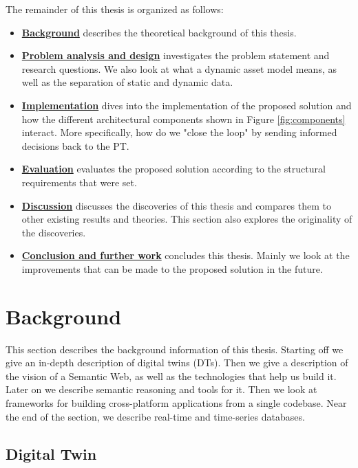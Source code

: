 \documentclass{article}
\begin{document}
The remainder of this thesis is organized as follows:
\begin{itemize}
    \item \hyperref[sec:Background]{\textbf{Background}} describes the theoretical background of this thesis.
    \item \hyperref[sec:Analysis]{\textbf{Problem analysis and design}} investigates the problem statement and research questions. We also look at what a dynamic asset model means, as well as the separation of static and dynamic data.
    \item \hyperref[sec:Implementation]{\textbf{Implementation}} dives into the implementation of the proposed solution and how the different architectural components shown in Figure \ref{fig:components} interact. More specifically, how do we "close the loop" by sending informed decisions back to the PT. 
    \item \hyperref[sec:Evaluation]{\textbf{Evaluation}} evaluates the proposed solution according to the structural requirements that were set.
    \item \hyperref[sec:Discussion]{\textbf{Discussion}} discusses the discoveries of this thesis and compares them to other existing results and theories. This section also explores the originality of the discoveries.
    \item \hyperref[sec:Conclusion]{\textbf{Conclusion and further work}} concludes this thesis. Mainly we look at the improvements that can be made to the proposed solution in the future.  
\end{itemize}



\newpage
\section{Background}\label{sec:Background}
This section describes the background information of this thesis. Starting off we give an in-depth description of digital twins (DTs). Then we give a description of the vision of a Semantic Web, as well as the technologies that help us build it. Later on we describe semantic reasoning and tools for it.  Then we look at frameworks for building cross-platform applications from a single codebase. Near the end of the section, we describe real-time and time-series databases.

\subsection{Digital Twin}\label{subsec:DigitalTwins}
\end{document}
